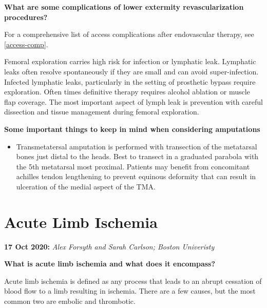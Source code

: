 \documentclass[
]{book}
\providecommand{\tightlist}{%
  \setlength{\itemsep}{0pt}\setlength{\parskip}{0pt}}
\begin{document}
\textbf{What are some complications of lower extermity revascularization
procedures?}

For a comprehensive list of access complications after endovascular
therapy, see \ref{access-comp}.

Femoral exploration carries high risk for infection or lymphatic leak.
Lymphatic leaks often resolve spontaneously if they are small and can
avoid super-infection. Infected lymphatic leaks, particularly in the
setting of prosthetic bypass require exploration. Often times definitive
therapy requires alcohol ablation or muscle flap coverage. The most
important aspect of lymph leak is prevention with careful dissection and
tissue management during femoral exploration.\citep{obara2014, weaver2014}

\textbf{Some important things to keep in mind when considering amputations}

\begin{itemize}
\tightlist
\item
  Transmetatersal amputation is performed with transection of the
  metatarsal bones just distal to the heads. Best to transect in a
  graduated parabola with the 5th metatarsal most proximal. Patients
  may benefit from concomitant achilles tendon lengthening to prevent
  equinous deformity that can result in ulceration of the medial
  aspect of the TMA.\citep{eidt2019}
\end{itemize}

\hypertarget{acute-limb-ischemia-1}{%
\section{Acute Limb Ischemia}\label{acute-limb-ischemia-1}}

\textbf{17 Oct 2020:} \emph{Alex Forsyth and Sarah Carlson; Boston Univeristy}

\textbf{What is acute limb ischemia and what does it encompass?}

Acute limb ischemia is defined as any process that leads to an abrupt
cessation of blood flow to a limb resulting in ischemia. There are a few
causes, but the most common two are embolic and thrombotic.
\end{document}
